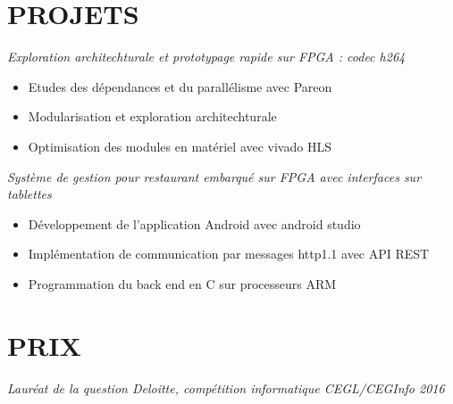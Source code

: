 \documentclass[margin, 10pt]{res} %
\begin{document}
\begin{resume}
 
\section{PROJETS}

{\sl Exploration architechturale et prototypage rapide sur FPGA : codec h264}
\begin{itemize} \itemsep -2pt %
\item Etudes des d\'ependances et du parall\'elisme avec Pareon
\item Modularisation et exploration architechturale
\item Optimisation des modules en mat\'eriel avec vivado HLS
\end{itemize} 

{\sl Syst\`eme de gestion pour restaurant embarqu\'e sur FPGA avec interfaces sur tablettes}
\begin{itemize} \itemsep -2pt %
\item D\'eveloppement de l’application Android avec android studio
\item  Impl\'ementation de communication par messages http1.1 avec API REST
\item  Programmation du back end en C sur processeurs ARM
\end{itemize} 

 
\section{PRIX}

{\sl Laur\'eat de la question Deloitte, comp\'etition informatique CEGL/CEGInfo 2016}

\end{resume}
\end{document}
